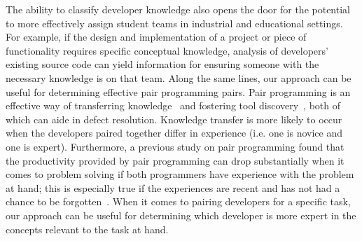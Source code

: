 The ability to classify developer knowledge also opens the door for the potential to more effectively assign student teams in industrial and educational settings. For example, if the design and implementation of a project or piece of functionality requires specific conceptual knowledge, analysis of developers' existing source code can yield information for ensuring someone with the necessary knowledge is on that team.
Along the same lines, our approach can be useful for determining effective pair programming pairs. Pair programming is an effective way of transferring knowledge~\cite{plonka2015knowledge} and fostering tool discovery~\cite{murphy2011peer}, both of which can aide in defect resolution. Knowledge transfer is more likely to occur when the developers paired together differ in experience (i.e. one is novice and one is expert). Furthermore, a previous study on pair programming found that the productivity provided by pair programming can drop substantially when it comes to problem solving if both programmers have experience with the problem at hand; this is especially true if the experiences are recent and has not had a chance to be forgotten~\cite{lui2006pair}. When it comes to pairing developers for a specific task, our approach can be useful for determining which developer is more expert in the concepts relevant to the task at hand.




